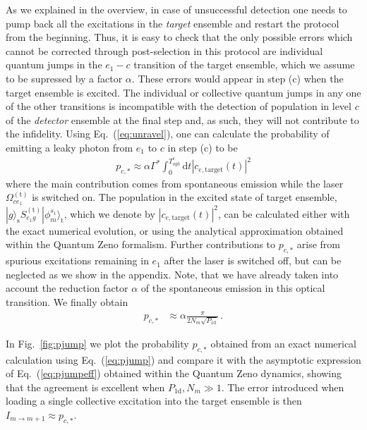 \documentclass[twocolumn,pra,aps,superscriptaddress,showpacs]{revtex4-1}
\newcommand{\ket}[1]{|#1\rangle}
\def\oned{\mathrm{1d}}
\newcommand{\trg}{\mathrm{(t)}}
\newcommand{\rs}{\mathrm{s}}
\newcommand{\rd}{\mathrm{d}}
\newcommand{\rt}{\mathrm{t}}
\begin{document}
As we explained in the overview, in case of unsuccessful detection one needs to pump back all the excitations in the \emph{target} ensemble and restart the protocol from the beginning. Thus, it is easy to check that the only possible errors which cannot be corrected through post-selection in this protocol are individual quantum jumps in the $e_1-c$ transition of the target ensemble, which we assume to be supressed by a factor $\alpha$. These errors would appear in step (c) when the target ensemble is excited. The individual or collective quantum jumps in any one of the other transitions is incompatible with the detection of population in level $c$ of the \emph{detector} ensemble at the final step and, as such, they will not contribute to the infidelity. Using Eq.~(\ref{eq:unravel}), one can calculate the probability of emitting a leaky photon from $e_1 $ to $c$ in step (c) to be
%
\begin{align} \label{eq:pjump}
p_{c,*}
	\approx \alpha \Gamma^*\int_0^{T_\mathrm{opt}^c} \rd t |c_{e,\mathrm{target}} (t) |^2
\end{align}
%
where the main contribution comes from spontaneous emission while the laser $\Omega_{ce_1}^\trg$ is switched on. The population in the excited state of target ensemble, $\ket{g}_\rs S_{e_1 g}^\trg \ket{\phi_m^{s_1}}_\rt$, which we denote by $|c_{e,\mathrm{target}} (t) |^2$, can be calculated either with the exact numerical evolution, or using the analytical approximation obtained within the Quantum Zeno formalism. Further contributions to $p_{c,*}$ arise from spurious excitations remaining in $e_1$ after the laser is switched off, but can be neglected as we show in the appendix. Note, that we have already taken into account the reduction factor $\alpha$ of the spontaneous emission in this optical transition. We finally obtain
%
\begin{align} \label{eq:pjumpeff}
p_{c,*}
	&\approx \alpha \frac{\pi}{2 N_m \sqrt{P_\oned} }\,.
\end{align}
%

In Fig.~\ref{fig:pjump} we plot the probability $p_{c,*}$ obtained from an exact numerical calculation using Eq.~(\ref{eq:pjump}) and compare it with the asymptotic expression of Eq.~(\ref{eq:pjumpeff}) obtained within the Quantum Zeno dynamics, showing that the agreement is excellent when $P_\oned,N_m\gg 1$. The error introduced when loading a single collective excitation into the target ensemble is then $I_{m \rightarrow m+1} \approx p_{c,*}$.
\end{document}
